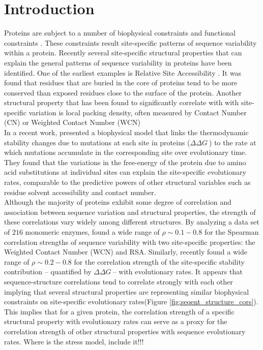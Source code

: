 \documentclass[12pt]{article}
\newcommand{\ddg}{$\Delta\Delta G~$}
\begin{document}
\section{Introduction}
\label{sec:intro}


Proteins are subject to a number of biophysical constraints and functional constraints \citep{Scherreretal2012, Wilkeetal2010}. These constraints result site-specific patterns of sequence variability within a protein. Recently several site-specific structural properties that can explain the general patterns of sequence variability in proteins have been identified. One of the earliest examples is Relative Site Accessibility \citep{Ramseyetal2011, Fransozaetal2009}. It was found that residues that are buried in the core of proteins tend to be more conserved than exposed residues close to the surface of the protein.  Another structural property that has been found to significantly correlate with with site-specific variation is local packing density, often measured by Contact Number (CN) or Weighted Contact Number (WCN) \citep{Liaoetal2005, Yehetal2014, Huangetal2014}\\
\indent In a recent work, \cite{Echaveetal2015} presented a biophysical model that links the thermodynamic stability changes due to mutations at each site in proteins (\ddg)  to the rate at which mutations accumulate in the corresponding site over evolutionary time. They found that the variations in the free-energy of the protein due to amino acid substitutions at individual sites can explain the site-specific evolutionary rates, comparable to the predictive powers of other structural variables such as residue solvent accessibility and contact number. \\
\indent Although the majority of proteins exhibit some degree of correlation and association between sequence variation and structural properties, the strength of these correlations vary widely among different structures. By analyzing a data set of $216$ monomeric enzymes, \cite{Yehetal2014} found a wide range of $\rho\sim0.1-0.8$ for the Spearman correlation strengths of sequence variability with two site-specific properties: the Weighted Contact Number (WCN) and RSA. Similarly, \citep{Echaveetal2015} recently found a wide range of $\rho\sim0.2-0.8$ for the correlation strength of the site-specific stability contribution -- quantified by \ddg -- with evolutionary rates. It appears that sequence-structure correlations tend to correlate strongly with each other implying that several structural properties are representing similar biophysical constraints on site-specific evolutionary rates(Figure \ref{fig:seqent_structure_cors}). This implies that for a given protein, the correlation strength of a specific structural property with evolutionary rates can serve as a proxy for the correlation strength of other structural properties with sequence evolutionary rates. {\color{red} Where is the stress model, include it!!!}\\
\end{document}
